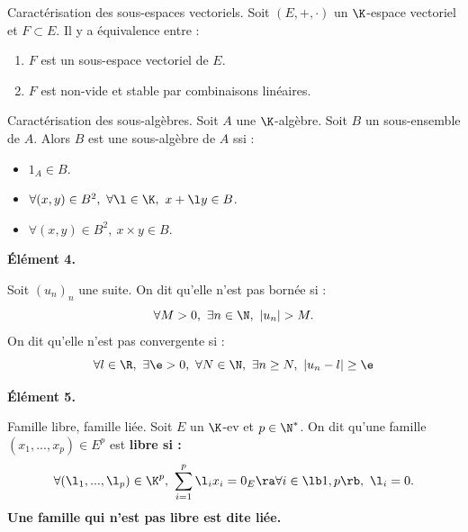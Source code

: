 \documentclass[11pt]{article}
\begin{document}
\begin{rappel}{Caractérisation des sous-espaces vectoriels.}{}
    Soit $(E,+,\cdot)$ un $\K$-espace vectoriel et $F\subset E$. Il y a équivalence entre :
    \begin{enumerate}
        \item $F$ est un sous-espace vectoriel de $E$.
        \item $F$ est non-vide et stable par combinaisons linéaires.
    \end{enumerate}
\end{rappel}

\begin{prop}{Caractérisation des sous-algèbres.}{}
    Soit $A$ une $\K$-algèbre. Soit $B$ un sous-ensemble de $A$. Alors $B$ est une sous-algèbre de $A$ ssi :
    \begin{itemize}
        \item $1_A\in B$.
        \item $\forall (x,y)\in B^2, ~ \forall \l \in \K, ~ x+\l y \in B$.
        \item $\forall (x,y)\in B^2, ~ x\times y \in B$.
    \end{itemize}
\end{prop}

\bf{Élément 4.}

\begin{defi}{}{}
    Soit $(u_n)_n$ une suite. On dit qu'elle n'est pas bornée si :
    \begin{equation*}
        \forall M > 0, ~ \exists n \in \N, ~ |u_n| > M.
    \end{equation*}
    On dit qu'elle n'est pas convergente si :
    \begin{equation*}
        \forall l \in \R, ~ \exists \e > 0, ~ \forall N \in \N, ~ \exists n \geq N, ~ |u_n-l|\geq\e
    \end{equation*}
\end{defi}

\bf{Élément 5.}

\begin{defi}{Famille libre, famille liée.}{}
    Soit $E$ un $\K$-ev et $p\in\N^*$. On dit qu'une famille $(x_1,...,x_p)\in E^p$ est \bf{libre} si :
    \begin{equation*}
        \forall (\l_1,...,\l_p) \in \K^p, ~ \sum_{i=1}^p\l_ix_i=0_E \ra \forall i \in \lb1,p\rb, ~ \l_i = 0.
    \end{equation*}
    Une famille qui n'est pas libre est dite \bf{liée}.
\end{defi}
\end{document}
